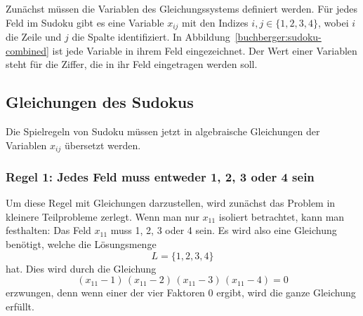 Zunächst müssen die Variablen des Gleichungssystems definiert werden.
Für jedes Feld im Sudoku gibt es eine Variable $x_{ij}$ mit den Indizes $i, j \in \{1, 2, 3, 4\}$, wobei $i$ die Zeile und $j$ die Spalte identifiziert.
In Abbildung~\ref{buchberger:sudoku-combined} ist jede Variable in ihrem Feld eingezeichnet.
Der Wert einer Variablen steht für die Ziffer, die in ihr Feld eingetragen werden soll.

\subsection{Gleichungen des Sudokus
\label{buchberger:subsection:gleichungen-des-sudokus}}
Die Spielregeln von Sudoku müssen jetzt in algebraische Gleichungen der Variablen $x_{ij}$ übersetzt werden.
\subsubsection{Regel 1: Jedes Feld muss entweder 1, 2, 3 oder 4 sein}
Um diese Regel mit Gleichungen darzustellen, wird zunächst das Problem in kleinere Teilprobleme zerlegt.
Wenn man nur $x_{11}$ isoliert betrachtet, kann man festhalten:
Das Feld $x_{11}$ muss 1, 2, 3 oder 4 sein.
Es wird also eine Gleichung benötigt, welche die Lösungsmenge
\[
L = \{1, 2, 3, 4\}
\]
hat.
Dies wird durch die Gleichung
\begin{equation}
  (x_{11} - 1)\,(x_{11} - 2)\,(x_{11} - 3)\,(x_{11} - 4) = 0
  \label{buchberger:sudoku-gleichung-1}
\end{equation}
erzwungen, denn wenn einer der vier Faktoren 0 ergibt, wird die ganze Gleichung erfüllt.


